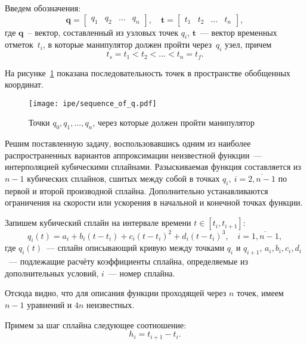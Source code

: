Введем обозначения:
\begin{equation}\label{knots}
	\bm{q} = 
	\begin{bmatrix}
		q_1 & q_2 & \dots & q_n
	\end{bmatrix},
	\quad
	\bm{t} =
	\begin{bmatrix}
	t_1 & t_2 & \dots & t_n
	\end{bmatrix},
\end{equation}
где $ \bm{q} $~-- вектор, составленный из узловых точек $ q_i $, $ \bm{t}$~--- вектор временных отметок~$ t_i $, в которые манипулятор должен пройти через~$ q_i $ узел, причем
\begin{equation}
	t_s = t_1 < t_2 < \dots < t_n = t_f.
\end{equation}

На рисунке~\ref{img:seq_points} показана последовательность точек в пространстве обобщенных координат.

\begin{figure}[h!]
	\centering\texttt{[image: ipe/sequence\_of\_q.pdf]}
	\vspace{0.5cm}
	\caption{Точки $ q_0, q_1, \dots, q_{n} $, через которые должен пройти манипулятор}
	\label{img:seq_points}
\end{figure}

Решим поставленную задачу, воспользовавшись одним из наиболее распространенных вариантов аппроксимации неизвестной функции~--- интерполяцией кубическими сплайнами. Разыскиваемая функция составляется из $ n-1 $ кубических сплайнов, сшитых между собой в точках $ q_i,\:i = \overline{2,n-1} $ по первой и второй производной сплайна. Дополнительно устанавливаются ограничения на скорости или ускорения в начальной и конечной точках функции.

Запишем кубический сплайн на интервале времени $ t \in [t_{i}, t_{i+1}] $:
\begin{equation}\label{splin}
	q_i(t) = a_i + b_i (t-t_i) + c_i (t-t_i)^2 + d_i (t-t_i)^3,
	\quad
	i = \overline{1,n-1},
\end{equation}
где $q_i(t)$~--- сплайн описывающий кривую между точками $ q_i $ и $ q_{i+1}$, $ a_i, b_i, c_i, d_i $~--- подлежащие расчёту коэффициенты сплайна, определяемые из дополнительных условий, $i$~--- номер сплайна.

Отсюда видно, что для описания функции проходящей через $ n $ точек, имеем $ n-1 $ уравнений и $ 4n $ неизвестных.

Примем за шаг сплайна следующее соотношение:
\begin{equation}\label{hi}
	h_i = t_{i+1} - t_i.
\end{equation}

